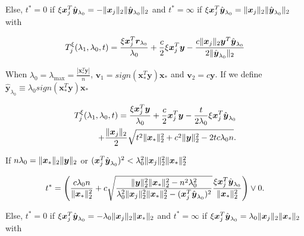 Else, $t^*=0$ if $\xi\boldsymbol x_j^T\hat{\boldsymbol y}_{\lambda_0}=-\lVert\boldsymbol x_j\rVert_2\lVert\hat{\boldsymbol y}_{\lambda_0}\rVert_2$ and $t^*=\infty$ if $\xi\boldsymbol x_j^T\hat{\boldsymbol y}_{\lambda_0}=\lVert\boldsymbol x_j\rVert_2\lVert\hat{\boldsymbol y}_{\lambda_0}\rVert_2$ with

\begin{equation}
    T^\xi_j(\lambda_1,\lambda_0,t)=\frac{\xi \boldsymbol x_j^T \boldsymbol r_{\lambda_0}}{\lambda_0}+\frac{c}{2}\xi\boldsymbol x_j^T\boldsymbol y-\frac{c\lVert\boldsymbol x_j\rVert_2\boldsymbol y^T\hat{\boldsymbol y}_{\lambda_0}}{2\lVert\hat{\boldsymbol y}_{\lambda_0}\rVert_2}
\end{equation}

When $\lambda_0=\lambda_{\max}=\frac{|\boldsymbol x_*^T\boldsymbol y|}{n}$, $\boldsymbol v_1=sign(\boldsymbol x_*^T\boldsymbol y)\boldsymbol x_*$ and $\boldsymbol v_2=c\boldsymbol y$. If we define $\hat{\boldsymbol y}_{\lambda_0}\equiv \lambda_0sign(\boldsymbol x_*^T\boldsymbol y) \boldsymbol x_*$

\begin{gather}
    \begin{aligned}
        T^\xi_j(\lambda_1,\lambda_0,t)= \frac{\xi \boldsymbol x_j^T \boldsymbol y}{\lambda_0}+ \frac{c}{2}\boldsymbol x_j^T\boldsymbol y-\frac{t}{2\lambda_0}\xi\boldsymbol x_j^T\hat{\boldsymbol y}_{\lambda_0}\\
        +\frac{\lVert\boldsymbol x_j\rVert_2}{2}\sqrt{t^2\lVert\boldsymbol x_*\rVert_2^2+c^2\lVert\boldsymbol y\rVert_2^2-2tc\lambda_0n}.
    \end{aligned}
\end{gather}

If $n\lambda_0=\lVert\boldsymbol x_*\rVert_2\lVert\boldsymbol y\rVert_2$ or $(\boldsymbol x_j^T\hat{\boldsymbol y}_{\lambda_0})^2<\lambda_0^2\lVert\boldsymbol x_j\rVert_2^2\lVert\boldsymbol x_*\rVert_2^2$

\begin{equation}
    t^*=\left(\frac{c\lambda_0n}{\lVert\boldsymbol x_*\rVert_2^2}+c\sqrt{\frac{\lVert\boldsymbol y\rVert_2^2\lVert\boldsymbol x_*\rVert_2^2-n^2\lambda_0^2}{\lambda_0^2\lVert\boldsymbol x_j\rVert_2^2\lVert\boldsymbol x_*\rVert_2^2-(\boldsymbol x_j^T\hat{\boldsymbol y}_{\lambda_0})^2}}\frac{\xi\boldsymbol x_j^T\hat{\boldsymbol y}_{\lambda_0}}{\lVert\boldsymbol x_*\rVert_2^2}\right)\vee 0.
\end{equation}

Else, $t^*=0$ if $\xi\boldsymbol x_j^T\hat{\boldsymbol y}_{\lambda_0}=-\lambda_0\lVert\boldsymbol x_j\rVert_2\lVert\boldsymbol x_*\rVert_2$ and $t^*=\infty$ if $\xi\boldsymbol x_j^T\hat{\boldsymbol y}_{\lambda_0}=\lambda_0\lVert\boldsymbol x_j\rVert_2\lVert\boldsymbol x_*\rVert_2$ with


